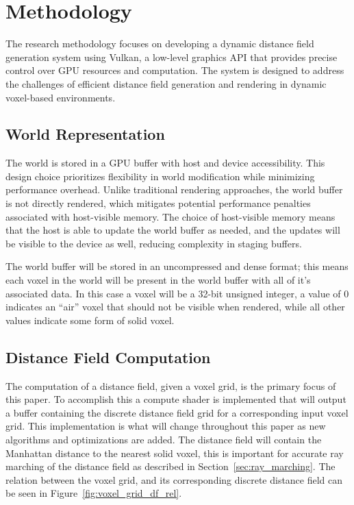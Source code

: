 \chapter{Methodology}
The research methodology focuses on developing a dynamic distance field generation system using Vulkan, a low-level
graphics API that provides precise control over GPU resources and computation. The system is designed to address the
challenges of efficient distance field generation and rendering in dynamic voxel-based environments.

\section{World Representation}
The world is stored in a GPU buffer with host and device accessibility. This design choice prioritizes flexibility in
world modification while minimizing performance overhead. Unlike traditional rendering approaches, the world buffer is
not directly rendered, which mitigates potential performance penalties associated with host-visible memory. The choice
of host-visible memory means that the host is able to update the world buffer as needed, and the updates will be visible
to the device as well, reducing complexity in staging buffers.

The world buffer will be stored in an uncompressed and dense format; this means each voxel in the world will be
present in the world buffer with all of it's associated data. In this case a voxel will be a 32-bit unsigned integer, a
value of 0 indicates an ``air'' voxel that should not be visible when rendered, while all other values indicate some
form of solid voxel.

\section{Distance Field Computation} \label{sec:df_repr}
The computation of a distance field, given a voxel grid, is the primary focus of this paper. To accomplish this a
compute shader is implemented that will output a buffer containing the discrete distance field grid for a corresponding
input voxel grid. This implementation is what will change throughout this paper as new algorithms and optimizations are
added. The distance field will contain the Manhattan distance to the nearest solid voxel, this is important for accurate
ray marching of the distance field as described in Section~\ref{sec:ray_marching}. The relation between the voxel grid,
and its corresponding discrete distance field can be seen in Figure~\ref{fig:voxel_grid_df_rel}.

